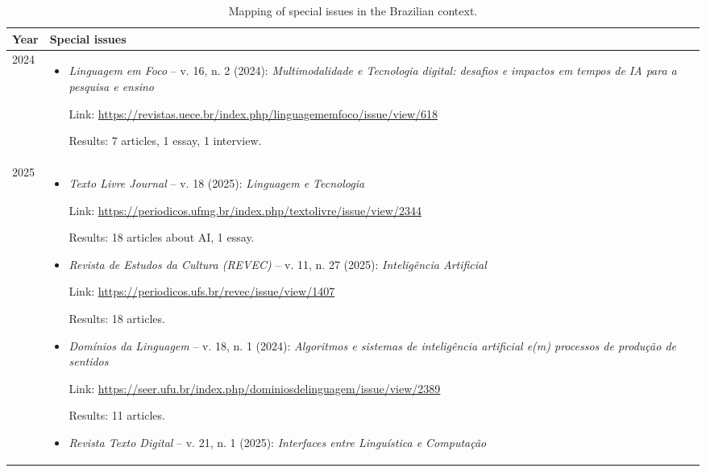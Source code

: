 \documentclass[english]{textolivre}
\begin{document}
\begin{table}[htbp]
\centering
\caption{Mapping of special issues in the Brazilian context.}
\label{tab3}
\begin{threeparttable}
\renewcommand{\arraystretch}{1.2}
\begin{tabularx}{\textwidth}{p{1cm}X}
\hline
Year & Special issues \\
\hline

2024 &
\vspace{-0.75em}
\begin{itemize}\setlength\itemsep{0.2em}
\item \textit{Linguagem em Foco} -- v. 16, n. 2 (2024): \textit{Multimodalidade e Tecnologia digital: desafios e impactos em tempos de IA para a pesquisa e ensino}

Link: \url{https://revistas.uece.br/index.php/linguagememfoco/issue/view/618}

Results: 7 articles, 1 essay, 1 interview.
\end{itemize}
\\
\hline

2025 &
\vspace{-0.75em}
\begin{itemize}\setlength\itemsep{0.8em}

\item \textit{Texto Livre Journal} -- v. 18 (2025): \textit{Linguagem e Tecnologia}

Link: \url{https://periodicos.ufmg.br/index.php/textolivre/issue/view/2344}

Results: 18 articles about AI, 1 essay.

\item \textit{Revista de Estudos da Cultura (REVEC)} -- v. 11, n. 27 (2025): \textit{Inteligência Artificial}

Link: \url{https://periodicos.ufs.br/revec/issue/view/1407}

Results: 18 articles.

\item \textit{Domínios da Linguagem} -- v. 18, n. 1 (2024): \textit{Algoritmos e sistemas de inteligência artificial e(m) processos de produção de sentidos}

Link: \url{https://seer.ufu.br/index.php/dominiosdelinguagem/issue/view/2389}

Results: 11 articles.

\item \textit{Revista Texto Digital} -- v. 21, n. 1 (2025): \textit{Interfaces entre Linguística e Computação}


\end{itemize}
\end{tabularx}
\end{threeparttable}
\end{table}
\end{document}
